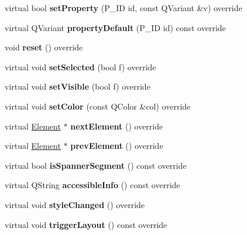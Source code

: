 \begin{DoxyCompactItemize}
virtual bool {\bfseries set\+Property} (P\+\_\+\+ID id, const Q\+Variant \&v) override
\item 
\mbox{\label{class_ms_1_1_spanner_segment_ad752d41b641e3ad380b7e7711cbb0b3f}} 
virtual Q\+Variant {\bfseries property\+Default} (P\+\_\+\+ID id) const override
\item 
\mbox{\label{class_ms_1_1_spanner_segment_ab15de65b735f39e333865eab130fd975}} 
void {\bfseries reset} () override
\item 
\mbox{\label{class_ms_1_1_spanner_segment_a478ec654aceaeb8e2a90196db7d02f60}} 
virtual void {\bfseries set\+Selected} (bool f) override
\item 
\mbox{\label{class_ms_1_1_spanner_segment_a823e1c4728798fd7baf09349b71dca10}} 
virtual void {\bfseries set\+Visible} (bool f) override
\item 
\mbox{\label{class_ms_1_1_spanner_segment_a606bfba6cc30a53cde3c0b5e6a23c746}} 
virtual void {\bfseries set\+Color} (const Q\+Color \&col) override
\item 
\mbox{\label{class_ms_1_1_spanner_segment_aee004e4e7089cbd376a8eb8a0190c3c8}} 
virtual \hyperlink{class_ms_1_1_element}{Element} $\ast$ {\bfseries next\+Element} () override
\item 
\mbox{\label{class_ms_1_1_spanner_segment_a9a89931e85bd1e73a3a8d00073ea805a}} 
virtual \hyperlink{class_ms_1_1_element}{Element} $\ast$ {\bfseries prev\+Element} () override
\item 
\mbox{\label{class_ms_1_1_spanner_segment_ab828b5ef17a09d00c94182edc2cd70d6}} 
virtual bool {\bfseries is\+Spanner\+Segment} () const override
\item 
\mbox{\label{class_ms_1_1_spanner_segment_a03e8da68c13ea95895a2180c8dbb572d}} 
virtual Q\+String {\bfseries accessible\+Info} () const override
\item 
\mbox{\label{class_ms_1_1_spanner_segment_a9aaf19bf67a956f42cf5d6da130d73ac}} 
virtual void {\bfseries style\+Changed} () override
\item 
\mbox{\label{class_ms_1_1_spanner_segment_ae7d680efe46ca7508f6290a389f83218}} 
virtual void {\bfseries trigger\+Layout} () const override
\end{DoxyCompactItemize}
